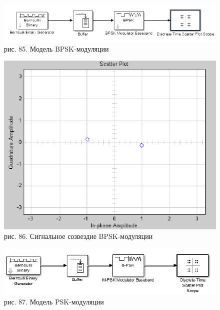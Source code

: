 \documentclass[10pt,a4paper]{report}
\begin{document}
\begin{figure}
\begin{center}
\includegraphics[width=150mm, scale = 0.9]{9_21}\newline
рис. 85. Модель BPSK-модуляции\newline
\end{center}
\end{figure}
\begin{figure}
\begin{center}
\includegraphics[width=150mm, scale = 0.9]{9_22}\newline
рис. 86. Сигнальное созвездие BPSK-модуляции\newline
\end{center}
\end{figure}
\begin{figure}
\begin{center}
\includegraphics[width=150mm, scale = 0.9]{9_23}\newline
рис. 87. Модель PSK-модуляции\newline
\end{center}
\end{figure}
\end{document}
